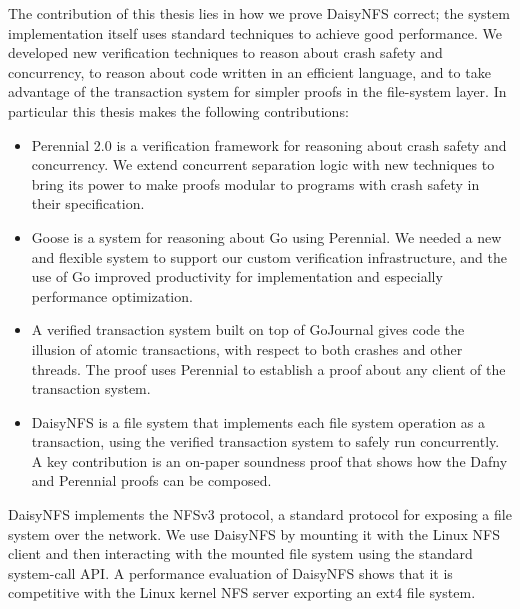 The contribution of this thesis lies in how we prove DaisyNFS correct; the
system implementation itself uses standard techniques to achieve good
performance. We developed new verification techniques to reason about crash
safety and concurrency, to reason about code written in an efficient language,
and to take advantage of the transaction system for simpler proofs in the
file-system layer. In particular this thesis makes the following contributions:
\begin{itemize}
  \item Perennial 2.0 is a verification framework for reasoning about crash
  safety and concurrency. We extend concurrent separation logic with new
  techniques to bring its power to make proofs modular to programs with crash
  safety in their specification.
  \item Goose is a system for reasoning about Go using Perennial. We needed a
  new and flexible system to support our custom verification infrastructure, and
  the use of Go improved productivity for implementation and especially
  performance optimization.
  \item A verified transaction system built on top of GoJournal gives code the
  illusion of atomic transactions, with respect to both crashes and other
  threads. The proof uses Perennial to establish a proof about any client of the
  transaction system.
  \item DaisyNFS is a file system that implements each file system operation as
  a transaction, using the verified transaction system to safely run
  concurrently. A key contribution is an on-paper soundness proof that shows how
  the Dafny and Perennial proofs can be composed.
\end{itemize}

DaisyNFS implements the NFSv3 protocol, a standard protocol for exposing
a file system over the network. We use DaisyNFS by mounting it with the
Linux NFS client and then interacting with the mounted file system using
the standard system-call API. A performance evaluation of DaisyNFS shows
that it is competitive with the Linux kernel NFS server exporting an
ext4 file system.
